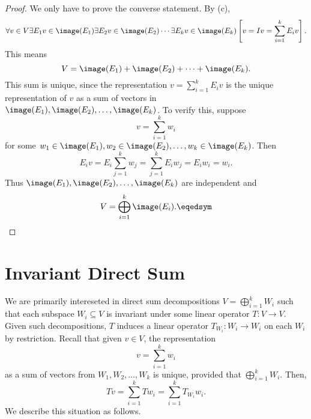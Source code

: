 \documentclass[linearalgebraII]{subfiles}
\begin{document}
    \begin{proof}
        We only have to prove the converse statement. By (c),
        \begin{equation*}
            \forall v\in V\exists E_1v\in \image(E_1)\exists E_2v\in \image(E_2)\cdots\exists E_kv\in \image(E_k) \left[ v = Iv = \sum^{k}_{i=1} E_iv \right].
        \end{equation*}
        This means
        \begin{equation*}
            V = \image(E_1) + \image(E_2) + \cdots + \image(E_k).
        \end{equation*}
        This sum is unique, since the representation $v = \sum^{k}_{i=1} E_iv$ is the unique representation of $v$ as a sum of vectors in $\image(E_1), \image(E_2), \ldots, \image(E_k)$. To verify this, suppose
        \begin{equation*}
            v = \sum^{k}_{i=1} w_i
        \end{equation*}
        for some $w_1\in \image(E_1), w_2\in \image(E_2), \ldots, w_k\in \image(E_k)$. Then
        \begin{equation*}
            E_iv = E_i \sum^{k}_{j=1} w_j = \sum^{k}_{j=1} E_iw_j = E_iw_i = w_i.
        \end{equation*}
        Thus $\image(E_1), \image(E_2), \ldots, \image(E_k)$ are independent and
        \begin{equation*}
            V = \bigoplus^{k}_{i=1} \image(E_i). \eqedsym
        \end{equation*}
    \end{proof}

    \section{Invariant Direct Sum}

    \begin{remark}
        We are primarily intereseted in direct sum decompositions $V = \bigoplus^{k}_{i=1} W_i$ such that each subspace $W_i\subseteq V$ is invariant under some linear operator $T:V\to V$. Given such decompositions, $T$ induces a linear operator $T_{W_i}: W_i\to W_i$ on each $W_i$ by restriction. Recall that given $v\in V$, the representation
        \begin{equation*}
            v = \sum^{k}_{i=1} w_i
        \end{equation*}
        as a sum of vectors from $W_1, W_2, \ldots, W_k$ is unique, provided that $\bigoplus^{k}_{i=1} W_i$. Then,
        \begin{equation*}
            Tv = \sum^{k}_{i=1} Tw_i = \sum^{k}_{i=1} T_{W_i}w_i.
        \end{equation*}
        We describe this situation as follows.
    \end{remark}
\end{document}

